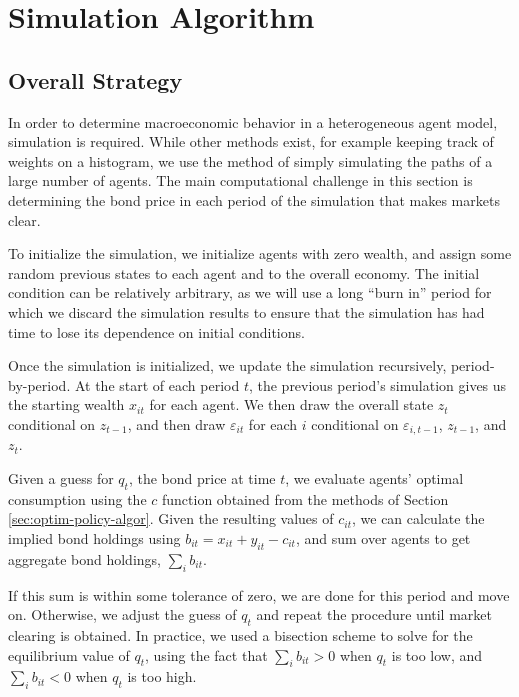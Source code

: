 \documentclass[a4paper,12pt]{article}
\newcommand{\eps}{\varepsilon}
\numberwithin{equation}{section}
\theoremstyle{definition}
\begin{document}
\section{Simulation Algorithm}
\label{sec:simulation-algorithm}

\subsection{Overall Strategy}

In order to determine macroeconomic behavior in a heterogeneous agent
model, simulation is required. While other methods exist, for example
keeping track of weights on a histogram, we use the method of simply
simulating the paths of a large number of agents. The main
computational challenge in this section is determining the bond price
in each period of the simulation that makes markets clear.

To initialize the simulation, we initialize agents with zero wealth,
and assign some random previous states to each agent and to the
overall economy. The initial condition can be relatively arbitrary, as
we will use a long ``burn in'' period for which we discard the
simulation results to ensure that the simulation has had time to lose
its dependence on initial conditions.

Once the simulation is initialized, we update the simulation
recursively, period-by-period. At the start of each period $t$, the
previous period's simulation gives us the starting wealth $x_{it}$ for
each agent. We then draw the overall state $z_t$ conditional on
$z_{t-1}$, and then draw $\eps_{it}$ for each $i$ conditional on
$\eps_{i,t-1}$, $z_{t-1}$, and $z_t$.

Given a guess for $q_t$, the bond price at time $t$, we evaluate
agents' optimal consumption using the $c$ function obtained from the
methods of Section \ref{sec:optim-policy-algor}. Given the resulting values of $c_{it}$, we can calculate the implied bond holdings using $b_{it} = x_{it} + y_{it} - c_{it}$, and sum over agents to get aggregate bond holdings, $\sum_i b_{it}$.

If this sum is within some tolerance of zero, we are done for this
period and move on. Otherwise, we adjust the guess of $q_t$ and repeat
the procedure until market clearing is obtained. In practice, we used
a bisection scheme to solve for the equilibrium value of $q_t$, using
the fact that $\sum_i b_{it} > 0$ when $q_t$ is too low, and $\sum_i
b_{it} < 0$ when $q_t$ is too high.
\end{document}
